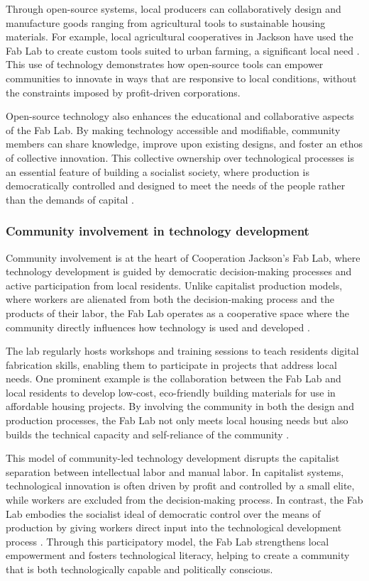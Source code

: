 \begin{refsection}
Through open-source systems, local producers can collaboratively design and manufacture goods ranging from agricultural tools to sustainable housing materials. For example, local agricultural cooperatives in Jackson have used the Fab Lab to create custom tools suited to urban farming, a significant local need \cite[pp.~120-136]{scholz2017}. This use of technology demonstrates how open-source tools can empower communities to innovate in ways that are responsive to local conditions, without the constraints imposed by profit-driven corporations. 

Open-source technology also enhances the educational and collaborative aspects of the Fab Lab. By making technology accessible and modifiable, community members can share knowledge, improve upon existing designs, and foster an ethos of collective innovation. This collective ownership over technological processes is an essential feature of building a socialist society, where production is democratically controlled and designed to meet the needs of the people rather than the demands of capital \cite[pp.~65-78]{raymond2022}.

\subsubsection{Community involvement in technology development}

Community involvement is at the heart of Cooperation Jackson's Fab Lab, where technology development is guided by democratic decision-making processes and active participation from local residents. Unlike capitalist production models, where workers are alienated from both the decision-making process and the products of their labor, the Fab Lab operates as a cooperative space where the community directly influences how technology is used and developed \cite[pp.~156-179]{kelley2022}. 

The lab regularly hosts workshops and training sessions to teach residents digital fabrication skills, enabling them to participate in projects that address local needs. One prominent example is the collaboration between the Fab Lab and local residents to develop low-cost, eco-friendly building materials for use in affordable housing projects. By involving the community in both the design and production processes, the Fab Lab not only meets local housing needs but also builds the technical capacity and self-reliance of the community \cite[pp.~60-72]{jackson2019}.

This model of community-led technology development disrupts the capitalist separation between intellectual labor and manual labor. In capitalist systems, technological innovation is often driven by profit and controlled by a small elite, while workers are excluded from the decision-making process. In contrast, the Fab Lab embodies the socialist ideal of democratic control over the means of production by giving workers direct input into the technological development process \cite[pp.~45-67]{marx2018}. Through this participatory model, the Fab Lab strengthens local empowerment and fosters technological literacy, helping to create a community that is both technologically capable and politically conscious.


\end{refsection}
